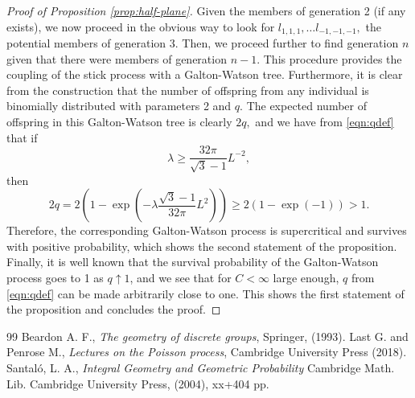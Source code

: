 \documentclass[10pt,a4paper]{amsart}
\begin{document}
\begin{proof}[Proof of Proposition \ref{prop:half-plane}]
Given the members of generation 2 (if any exists), we now proceed in the obvious way to look for 
$l_{1,1,1},\ldots l_{-1,-1,-1},$ the potential members of generation 3. Then, we proceed 
further to find generation $n$ given that there were members of generation $n-1.$ This 
procedure provides the coupling of the stick process with a Galton-Watson tree. 
Furthermore, it is clear from the construction that the number of offspring 
from any individual is 
binomially distributed with parameters 2 and $q.$ 
The expected number of offspring in this 
Galton-Watson tree is clearly $2q,$ and we have from \eqref{eqn:qdef} that if 
\[
\lambda \geq \frac{32 \pi}{\sqrt{3}-1}L^{-2},
\]
then
\[
2q = 2\left(1-\exp\left(-\lambda \frac{\sqrt{3}-1}{32 \pi}L^2\right)\right)
\geq 2\left(1-\exp\left(-1\right)\right)>1.
\]
Therefore, the corresponding Galton-Watson process is supercritical and survives 
with positive probability, which shows the second statement of the proposition.
Finally, it is well known that the survival probability of the 
Galton-Watson process
goes to 1 as $q \uparrow  1$, and we see that for $C<\infty$ large enough, 
$q$ from \eqref{eqn:qdef} can be made arbitrarily close to one. This shows the 
first statement of the proposition and concludes the proof.
\end{proof}

\begin{thebibliography}{99}
 Beardon A. F., {\em The geometry of discrete groups}, Springer, (1993).
 Last G. and Penrose M., {\em Lectures on the Poisson process},
Cambridge University Press (2018).
 Santaló, L. A., {\em Integral Geometry and Geometric Probability}
Cambridge Math. Lib.
Cambridge University Press, (2004), xx+404 pp.
\end{thebibliography}
\end{document}
